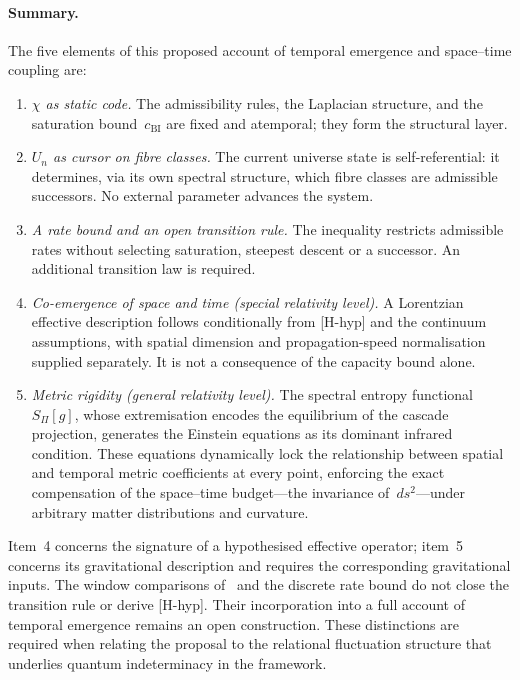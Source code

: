   \paragraph{Summary.}
    The five elements of this proposed account of temporal emergence and space--time coupling are:
    \begin{enumerate}
      \item \emph{$\chi$ as static code.}
      The admissibility rules, the Laplacian structure, and the saturation
      bound~$c_{\mathrm{BI}}$ are fixed and atemporal; they form the structural layer.
      \item \emph{$U_n$ as cursor on fibre classes.}
      The current universe state is self-referential: it determines, via its
      own spectral structure, which fibre classes are admissible successors.
      No external parameter advances the system.
      \item \emph{A rate bound and an open transition rule.}
      The inequality restricts admissible rates without selecting saturation, steepest descent or a successor.
      An additional transition law is required.
      \item \emph{Co-emergence of space and time (special relativity level).}
      A Lorentzian effective description follows conditionally from [H-hyp] and the continuum
      assumptions, with spatial dimension and propagation-speed normalisation supplied separately.
      It is not a consequence of the capacity bound alone.
      \item \emph{Metric rigidity (general relativity level).}
      The spectral entropy functional~$S_\Pi[g]$, whose extremisation encodes the
      equilibrium of the cascade projection, generates the Einstein equations as its
      dominant infrared condition.
      These equations dynamically lock the relationship between spatial and temporal
      metric coefficients at every point, enforcing the exact compensation of the
      space--time budget---the invariance of~$ds^2$---under arbitrary matter
      distributions and curvature.
    \end{enumerate}
    \noindent
    Item~4 concerns the signature of a hypothesised effective operator; item~5 concerns its gravitational
    description and requires the corresponding gravitational inputs.
    The window comparisons of~\cite{Beau2026a1} and the discrete rate bound do not close the transition
    rule or derive [H-hyp].
    Their incorporation into a full account of temporal emergence remains an open construction.
    These distinctions are required when relating the proposal to the relational fluctuation structure
    that underlies quantum indeterminacy in the framework.
